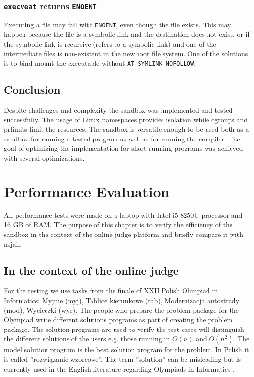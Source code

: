 \documentclass[en]{pracamgr}
\begin{document}
\subsection{\texttt{execveat} returns \texttt{ENOENT}} \label{execveat_returns_enoent}

Executing a file may fail with \texttt{ENOENT}, even though the file exists. This may happen because the file is a symbolic link and the destination does not exist, or if the symbolic link is recursive (refers to a symbolic link) and one of the intermediate files is non-existent in the new root file system. One of the solutions is to bind mount the executable without \texttt{AT\_SYMLINK\_NOFOLLOW}.

\section{Conclusion}

Despite challenges and complexity the sandbox was implemented and tested successfully. The usage of Linux namespaces provides isolation while cgroups and prlimits limit the resources. The sandbox is versatile enough to be used both as a sandbox for running a tested program as well as for running the compiler. The goal of optimizing the implementation for short-running programs was achieved with several optimizations.


\chapter{Performance Evaluation}\label{chapter:performance}

All performance tests were made on a laptop with Intel i5-8250U processor and 16 GB of RAM. The purpose of this chapter is to verify the efficiency of the sandbox in the context of the online judge platform and briefly compare it with nsjail.

\section{In the context of the online judge}

For the testing we use tasks from the finale of XXII Polish Olimpiad in Informatics: Myjnie (myj), Tablice kierunkowe (tab), Modernizacja autostrady (mod), Wycieczki (wyc). The people who prepare the problem package for the Olympiad write different solutions programs as part of creating the problem package. The solution programs are used to verify the test cases will distinguish the different solutions of the users e.g. those running in $O(n)$ and $O(n^2)$. The model solution program is the best solution program for the problem. In Polish it is called ''rozwiązanie wzorcowe''. The term ''solution'' can be misleading but is currently used in the English literature regarding Olympiads in Informatics \cite{kolstad2009infrastructure, marevs2012new, merry2010performance, merry2009using}.
\end{document}
